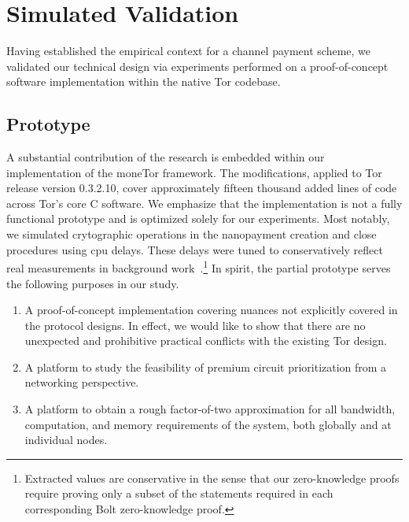 
\section{Simulated Validation}
\label{sec:experimentations}

Having established the empirical context for a channel payment scheme, we
validated our technical design via experiments performed on a proof-of-concept
software implementation within the native Tor codebase.

\subsection{Prototype}

A substantial contribution of the research is embedded within our implementation
of the moneTor framework. The modifications, applied to Tor release version
0.3.2.10, cover approximately fifteen thousand added lines of code across Tor's
core C software. We emphasize that the implementation is not a fully functional
prototype and is optimized solely for our experiments. Most notably, we
simulated crytographic operations in the nanopayment creation and close
procedures using cpu delays. These delays were tuned to conservatively reflect
real measurements in background work~\cite{green2017bolt}.\footnote{Extracted
  values are conservative in the sense that our zero-knowledge proofs require
  proving only a subset of the statements required in each corresponding Bolt
  zero-knowledge proof.}  In spirit, the partial prototype serves the following
purposes in our study.

\begin{enumerate}
\item A proof-of-concept implementation covering nuances not explicitly
  covered in the protocol designs. In effect, we would like to show that there
  are no unexpected and prohibitive practical conflicts with the existing Tor
  design.
\item A platform to study the feasibility of premium circuit
  prioritization from a networking perspective.
\item A platform to obtain a rough factor-of-two approximation for all
  bandwidth, computation, and memory requirements of the system, both globally
  and at individual nodes.
\end{enumerate}

